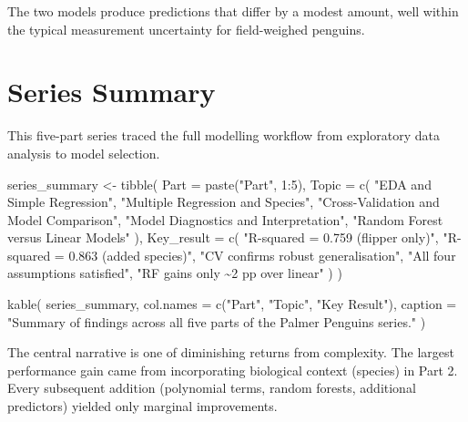 \documentclass[
  letterpaper,
  DIV=11,
  numbers=noendperiod]{scrartcl}
\newenvironment{Shaded}{\begin{snugshade}}{\end{snugshade}}
\newcommand{\AttributeTok}[1]{\textcolor[rgb]{0.40,0.45,0.13}{#1}}
\newcommand{\DecValTok}[1]{\textcolor[rgb]{0.68,0.00,0.00}{#1}}
\newcommand{\FunctionTok}[1]{\textcolor[rgb]{0.28,0.35,0.67}{#1}}
\newcommand{\NormalTok}[1]{\textcolor[rgb]{0.00,0.23,0.31}{#1}}
\newcommand{\OtherTok}[1]{\textcolor[rgb]{0.00,0.23,0.31}{#1}}
\newcommand{\SpecialCharTok}[1]{\textcolor[rgb]{0.37,0.37,0.37}{#1}}
\newcommand{\StringTok}[1]{\textcolor[rgb]{0.13,0.47,0.30}{#1}}
\begin{document}
The two models produce predictions that differ by a modest amount, well
within the typical measurement uncertainty for field-weighed penguins.

\section{Series Summary}\label{series-summary}

This five-part series traced the full modelling workflow from
exploratory data analysis to model selection.

\begin{Shaded}
\begin{Highlighting}[]
\NormalTok{series\_summary }\OtherTok{\textless{}{-}} \FunctionTok{tibble}\NormalTok{(}
  \AttributeTok{Part =} \FunctionTok{paste}\NormalTok{(}\StringTok{"Part"}\NormalTok{, }\DecValTok{1}\SpecialCharTok{:}\DecValTok{5}\NormalTok{),}
  \AttributeTok{Topic =} \FunctionTok{c}\NormalTok{(}
    \StringTok{"EDA and Simple Regression"}\NormalTok{,}
    \StringTok{"Multiple Regression and Species"}\NormalTok{,}
    \StringTok{"Cross{-}Validation and Model Comparison"}\NormalTok{,}
    \StringTok{"Model Diagnostics and Interpretation"}\NormalTok{,}
    \StringTok{"Random Forest versus Linear Models"}
\NormalTok{  ),}
  \AttributeTok{Key\_result =} \FunctionTok{c}\NormalTok{(}
    \StringTok{"R{-}squared = 0.759 (flipper only)"}\NormalTok{,}
    \StringTok{"R{-}squared = 0.863 (added species)"}\NormalTok{,}
    \StringTok{"CV confirms robust generalisation"}\NormalTok{,}
    \StringTok{"All four assumptions satisfied"}\NormalTok{,}
    \StringTok{"RF gains only \textasciitilde{}2 pp over linear"}
\NormalTok{  )}
\NormalTok{)}

\FunctionTok{kable}\NormalTok{(}
\NormalTok{  series\_summary,}
  \AttributeTok{col.names =} \FunctionTok{c}\NormalTok{(}\StringTok{"Part"}\NormalTok{, }\StringTok{"Topic"}\NormalTok{, }\StringTok{"Key Result"}\NormalTok{),}
  \AttributeTok{caption =} \StringTok{"Summary of findings across all five}
\StringTok{    parts of the Palmer Penguins series."}
\NormalTok{)}
\end{Highlighting}
\end{Shaded}

The central narrative is one of diminishing returns from complexity. The
largest performance gain came from incorporating biological context
(species) in Part 2. Every subsequent addition (polynomial terms, random
forests, additional predictors) yielded only marginal improvements.
\end{document}
